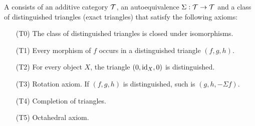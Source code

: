 \begin{definition}
A  consists of an additive category $\mathcal{T}$, an autoequivalence $\Sigma:\mathcal{T}\to\mathcal{T}$ and a class of distinguished triangles (exact triangles) that satisfy the following axioms:
\begin{itemize}
    \item[(T0)] The class of distinguished triangles is closed under isomorphisms.
    \item[(T1)] Every morphism of $f$ occurs in a distinguished triangle $(f,g,h)$.
    \item[(T2)] For every object $X$, the triangle $(0,\operatorname{id}_X,0)$ is distinguished.
    \item[(T3)] Rotation axiom. If $(f,g,h)$ is distinguished, such is $(g,h,-\Sigma f)$.
    \item[(T4)] Completion of triangles.
    \item[(T5)] Octahedral axiom.
\end{itemize}
\end{definition}

